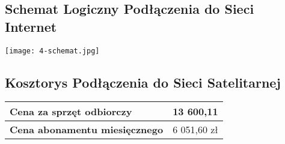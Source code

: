 \subsection{Schemat Logiczny Podłączenia do Sieci Internet}
    \texttt{[image: 4-schemat.jpg]}


\subsection{Kosztorys Podłączenia do Sieci Satelitarnej}
    \begin{flushleft}
        \begin{table}[h]
            \renewcommand{\arraystretch}{1.5}
            \begin{tabular}{|l|l|}
                \hline
                \textbf{Cena za sprzęt odbiorczy} & 13 600,11 \\
                \hline
                \textbf{Cena abonamentu miesięcznego} & 6 051,60 zł \\
                \hline
            \end{tabular}
        \end{table}
    \end{flushleft}


